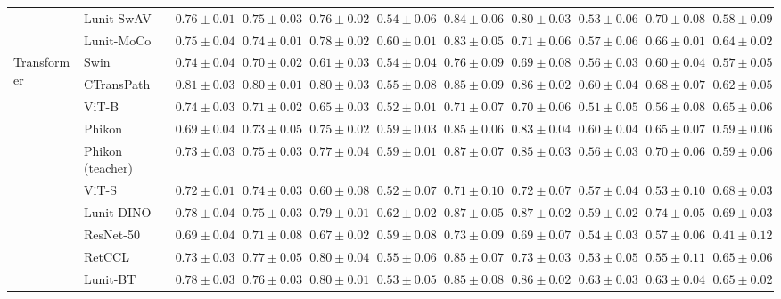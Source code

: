 \begin{tabular}{ll|cccc|c|cccc}
 & Lunit-SwAV & $0.76 \pm 0.01$ & $0.75 \pm 0.03$ & $0.76 \pm 0.02$ & $0.54 \pm 0.06$ & $0.84 \pm 0.06$ & $0.80 \pm 0.03$ & $0.53 \pm 0.06$ & $0.70 \pm 0.08$ & $0.58 \pm 0.09$ \\
 & Lunit-MoCo & $0.75 \pm 0.04$ & $0.74 \pm 0.01$ & $0.78 \pm 0.02$ & $0.60 \pm 0.01$ & $0.83 \pm 0.05$ & $0.71 \pm 0.06$ & $0.57 \pm 0.06$ & $0.66 \pm 0.01$ & $0.64 \pm 0.02$ \\
\cline{1-11}
\multirow[t]{12}{*}{Transformer} & Swin & $0.74 \pm 0.04$ & $0.70 \pm 0.02$ & $0.61 \pm 0.03$ & $0.54 \pm 0.04$ & $0.76 \pm 0.09$ & $0.69 \pm 0.08$ & $0.56 \pm 0.03$ & $0.60 \pm 0.04$ & $0.57 \pm 0.05$ \\
 & CTransPath & $\mathbf{0.81 \pm 0.03}$ & $\mathbf{0.80 \pm 0.01}$ & $0.80 \pm 0.03$ & $0.55 \pm 0.08$ & $0.85 \pm 0.09$ & $0.86 \pm 0.02$ & $0.60 \pm 0.04$ & $0.68 \pm 0.07$ & $0.62 \pm 0.05$ \\
 & ViT-B & $0.74 \pm 0.03$ & $0.71 \pm 0.02$ & $0.65 \pm 0.03$ & $0.52 \pm 0.01$ & $0.71 \pm 0.07$ & $0.70 \pm 0.06$ & $0.51 \pm 0.05$ & $0.56 \pm 0.08$ & $0.65 \pm 0.06$ \\
 & Phikon & $0.69 \pm 0.04$ & $0.73 \pm 0.05$ & $0.75 \pm 0.02$ & $0.59 \pm 0.03$ & $0.85 \pm 0.06$ & $0.83 \pm 0.04$ & $0.60 \pm 0.04$ & $0.65 \pm 0.07$ & $0.59 \pm 0.06$ \\
 & Phikon (teacher) & $0.73 \pm 0.03$ & $0.75 \pm 0.03$ & $0.77 \pm 0.04$ & $0.59 \pm 0.01$ & $0.87 \pm 0.07$ & $0.85 \pm 0.03$ & $0.56 \pm 0.03$ & $0.70 \pm 0.06$ & $0.59 \pm 0.06$ \\
 & ViT-S & $0.72 \pm 0.01$ & $0.74 \pm 0.03$ & $0.60 \pm 0.08$ & $0.52 \pm 0.07$ & $0.71 \pm 0.10$ & $0.72 \pm 0.07$ & $0.57 \pm 0.04$ & $0.53 \pm 0.10$ & $0.68 \pm 0.03$ \\
 & Lunit-DINO & $0.78 \pm 0.04$ & $0.75 \pm 0.03$ & $0.79 \pm 0.01$ & $\mathbf{0.62 \pm 0.02}$ & $\mathbf{0.87 \pm 0.05}$ & $\mathbf{0.87 \pm 0.02}$ & $0.59 \pm 0.02$ & $\mathbf{0.74 \pm 0.05}$ & $\mathbf{0.69 \pm 0.03}$ \\
 & ResNet-50 & $0.69 \pm 0.04$ & $0.71 \pm 0.08$ & $0.67 \pm 0.02$ & $0.59 \pm 0.08$ & $0.73 \pm 0.09$ & $0.69 \pm 0.07$ & $0.54 \pm 0.03$ & $0.57 \pm 0.06$ & $0.41 \pm 0.12$ \\
 & RetCCL & $0.73 \pm 0.03$ & $0.77 \pm 0.05$ & $0.80 \pm 0.04$ & $0.55 \pm 0.06$ & $0.85 \pm 0.07$ & $0.73 \pm 0.03$ & $0.53 \pm 0.05$ & $0.55 \pm 0.11$ & $0.65 \pm 0.06$ \\
 & Lunit-BT & $0.78 \pm 0.03$ & $0.76 \pm 0.03$ & $\mathbf{0.80 \pm 0.01}$ & $0.53 \pm 0.05$ & $0.85 \pm 0.08$ & $0.86 \pm 0.02$ & $\mathbf{0.63 \pm 0.03}$ & $0.63 \pm 0.04$ & $0.65 \pm 0.02$ \\

\end{tabular}
